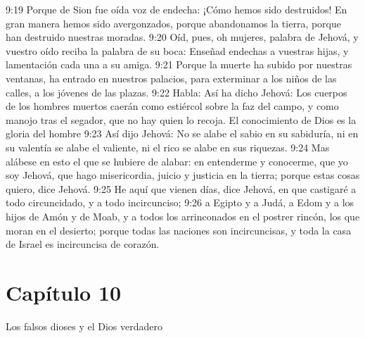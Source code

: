 9:19 Porque de Sion fue oída voz de endecha: ¡Cómo hemos sido destruidos! En gran manera hemos sido avergonzados, porque abandonamos la tierra, porque han destruido nuestras moradas. 
9:20 Oíd, pues, oh mujeres, palabra de Jehová, y vuestro oído reciba la palabra de su boca: Enseñad endechas a vuestras hijas, y lamentación cada una a su amiga. 
9:21 Porque la muerte ha subido por nuestras ventanas, ha entrado en nuestros palacios, para exterminar a los niños de las calles, a los jóvenes de las plazas. 
9:22 Habla: Así ha dicho Jehová: Los cuerpos de los hombres muertos caerán como estiércol sobre la faz del campo, y como manojo tras el segador, que no hay quien lo recoja. 
El conocimiento de Dios es la gloria del hombre 
9:23 Así dijo Jehová: No se alabe el sabio en su sabiduría, ni en su valentía se alabe el valiente, ni el rico se alabe en sus riquezas. 
9:24 Mas alábese en esto el que se hubiere de alabar: en entenderme y conocerme, que yo soy Jehová, que hago misericordia, juicio y justicia en la tierra; porque estas cosas quiero, dice Jehová. 
9:25 He aquí que vienen días, dice Jehová, en que castigaré a todo circuncidado, y a todo incircunciso; 
9:26 a Egipto y a Judá, a Edom y a los hijos de Amón y de Moab, y a todos los arrinconados en el postrer rincón, los que moran en el desierto; porque todas las naciones son incircuncisas, y toda la casa de Israel es incircuncisa de corazón. 
\section*{Capítulo 10 }
Los falsos dioses y el Dios verdadero 
 
